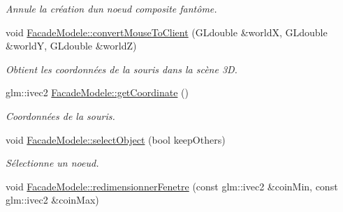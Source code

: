 \begin{DoxyCompactItemize}
\begin{DoxyCompactList}\small\item\em Annule la création d\textquotesingle{}un noeud composite fantôme. \end{DoxyCompactList}\item 
void \hyperlink{group__inf2990_ga8ddf1db58d72a811ce50cb830b0fa1c5}{Facade\+Modele\+::convert\+Mouse\+To\+Client} (G\+Ldouble \&world\+X, G\+Ldouble \&world\+Y, G\+Ldouble \&world\+Z)
\begin{DoxyCompactList}\small\item\em Obtient les coordonnées de la souris dans la scène 3\+D. \end{DoxyCompactList}\item 
\hypertarget{group__inf2990_ga937d173481bb6fed0de650dfacd64a76}{}glm\+::ivec2 \hyperlink{group__inf2990_ga937d173481bb6fed0de650dfacd64a76}{Facade\+Modele\+::get\+Coordinate} ()\label{group__inf2990_ga937d173481bb6fed0de650dfacd64a76}

\begin{DoxyCompactList}\small\item\em Coordonnées de la souris. \end{DoxyCompactList}\item 
void \hyperlink{group__inf2990_gaa1eea4eb52c6ec22980e0b21e2bdbcd4}{Facade\+Modele\+::select\+Object} (bool keep\+Others)
\begin{DoxyCompactList}\small\item\em Sélectionne un noeud. \end{DoxyCompactList}\item 
\hypertarget{group__inf2990_ga0a03742a7fa2215a6dd6de99cbfd7b05}{}void \hyperlink{group__inf2990_ga0a03742a7fa2215a6dd6de99cbfd7b05}{Facade\+Modele\+::redimensionner\+Fenetre} (const glm\+::ivec2 \&coin\+Min, const glm\+::ivec2 \&coin\+Max)\label{group__inf2990_ga0a03742a7fa2215a6dd6de99cbfd7b05}


\end{DoxyCompactItemize}

